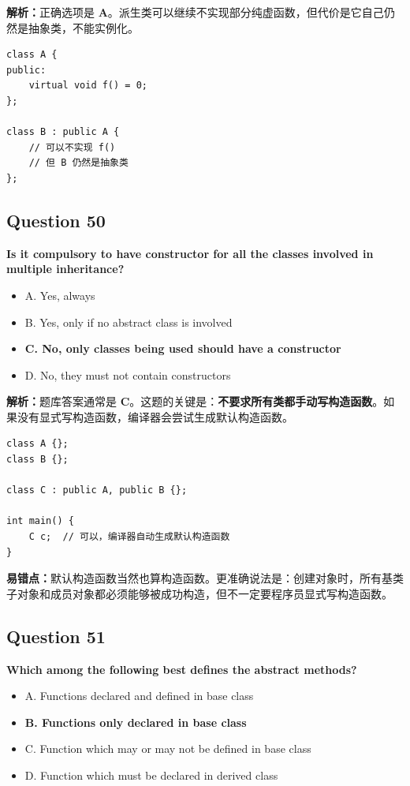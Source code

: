 \documentclass[11pt, a4paper]{article}
\begin{document}
\textbf{解析：}正确选项是 \textbf{A}。派生类可以继续不实现部分纯虚函数，但代价是它自己仍然是抽象类，不能实例化。
\begin{lstlisting}
class A {
public:
    virtual void f() = 0;
};

class B : public A {
    // 可以不实现 f()
    // 但 B 仍然是抽象类
};
\end{lstlisting}


\subsection*{Question 50}
\textbf{Is it compulsory to have constructor for all the classes involved in multiple inheritance?}
\begin{itemize}
    \item A. Yes, always
    \item B. Yes, only if no abstract class is involved
    \item \textbf{C. No, only classes being used should have a constructor}
    \item D. No, they must not contain constructors
\end{itemize}

\textbf{解析：}题库答案通常是 \textbf{C}。这题的关键是：\textbf{不要求所有类都手动写构造函数}。如果没有显式写构造函数，编译器会尝试生成默认构造函数。
\begin{lstlisting}
class A {};
class B {};

class C : public A, public B {};

int main() {
    C c;  // 可以，编译器自动生成默认构造函数
}
\end{lstlisting}

\textbf{易错点：}默认构造函数当然也算构造函数。更准确说法是：创建对象时，所有基类子对象和成员对象都必须能够被成功构造，但不一定要程序员显式写构造函数。


\subsection*{Question 51}
\textbf{Which among the following best defines the abstract methods?}
\begin{itemize}
    \item A. Functions declared and defined in base class
    \item \textbf{B. Functions only declared in base class}
    \item C. Function which may or may not be defined in base class
    \item D. Function which must be declared in derived class
\end{itemize}
\end{document}
